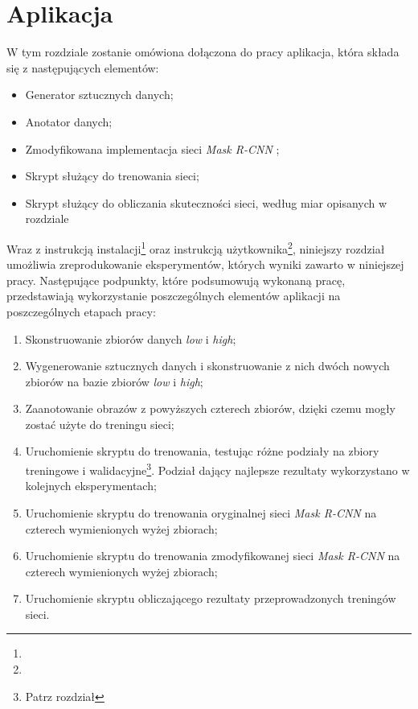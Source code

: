 \chapter{Aplikacja}
\label{sec:aplikacja}
W tym rozdziale zostanie omówiona dołączona do pracy aplikacja, która składa się z następujących elementów:
\begin{itemize}
  \item Generator sztucznych danych;
  \item Anotator danych;
  \item Zmodyfikowana implementacja sieci \textit{Mask R-CNN} \cite{matterport-mask-rcnn};
  \item Skrypt służący do trenowania sieci;
  \item Skrypt służący do obliczania skuteczności sieci, według miar opisanych w rozdziale 
\end{itemize}

Wraz z instrukcją instalacji\footnote{} oraz instrukcją użytkownika\footnote{}, niniejszy rozdział umożliwia zreprodukowanie eksperymentów, których wyniki zawarto w niniejszej pracy.
Następujące podpunkty, które podsumowują wykonaną pracę, przedstawiają wykorzystanie poszczególnych elementów aplikacji na poszczególnych etapach pracy:

\begin{enumerate}
 \item Skonstruowanie zbiorów danych \textit{low} i \textit{high};
 \item Wygenerowanie sztucznych danych i skonstruowanie z nich dwóch nowych zbiorów na bazie zbiorów \textit{low} i \textit{high};
 \item Zaanotowanie obrazów z powyższych czterech zbiorów, dzięki czemu mogły zostać użyte do treningu sieci;
 \item Uruchomienie skryptu do trenowania, testując różne podziały na zbiory treningowe i walidacyjne\footnote{Patrz rozdział }. Podział dający najlepsze rezultaty wykorzystano w kolejnych eksperymentach;
 \item Uruchomienie skryptu do trenowania oryginalnej sieci \textit{Mask R-CNN} na czterech wymienionych wyżej zbiorach;
 \item Uruchomienie skryptu do trenowania zmodyfikowanej sieci \textit{Mask R-CNN} na czterech wymienionych wyżej zbiorach;
 \item Uruchomienie skryptu obliczającego rezultaty przeprowadzonych treningów sieci.
\end{enumerate}



